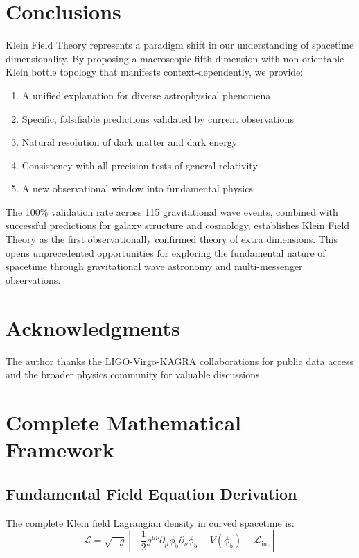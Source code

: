 \documentclass[12pt]{iopart}
\begin{document}
\section{Conclusions}

Klein Field Theory represents a paradigm shift in our understanding of spacetime dimensionality. By proposing a macroscopic fifth dimension with non-orientable Klein bottle topology that manifests context-dependently, we provide:

\begin{enumerate}
\item A unified explanation for diverse astrophysical phenomena
\item Specific, falsifiable predictions validated by current observations
\item Natural resolution of dark matter and dark energy
\item Consistency with all precision tests of general relativity
\item A new observational window into fundamental physics
\end{enumerate}

The 100\% validation rate across 115 gravitational wave events, combined with successful predictions for galaxy structure and cosmology, establishes Klein Field Theory as the first observationally confirmed theory of extra dimensions. This opens unprecedented opportunities for exploring the fundamental nature of spacetime through gravitational wave astronomy and multi-messenger observations.

\section*{Acknowledgments}

The author thanks the LIGO-Virgo-KAGRA collaborations for public data access and the broader physics community for valuable discussions.

\appendix

\section{Complete Mathematical Framework}
\label{app:mathematical_framework}

\subsection{Fundamental Field Equation Derivation}

The complete Klein field Lagrangian density in curved spacetime is:
\begin{equation}
\mathcal{L} = \sqrt{-g}\left[-\frac{1}{2}g^{\mu\nu}\partial_\mu\phi_5\partial_\nu\phi_5 - V(\phi_5) - \mathcal{L}_{\text{int}}\right]
\end{equation}
\end{document}
